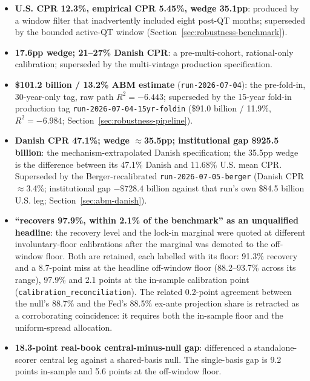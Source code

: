 \documentclass[12pt]{article}
\begin{document}
\begingroup\sloppy
\begin{itemize}
\item \textbf{U.S. CPR 12.3\%, empirical CPR 5.45\%, wedge 35.1pp}: produced by a window filter that inadvertently included eight post-QT months; superseded by the bounded active-QT window (Section~\ref{sec:robustness-benchmark}).
\item \textbf{17.6pp wedge; 21--27\% Danish CPR}: a pre-multi-cohort, rational-only calibration; superseded by the multi-vintage production specification.
\item \textbf{\$101.2 billion / 13.2\% ABM estimate} (\texttt{run-2026-07-04}): the pre-fold-in, 30-year-only tag, raw path $R^2 = -6.443$; superseded by the 15-year fold-in production tag \texttt{run-2026-07-04-15yr-foldin} (\$91.0 billion / 11.9\%, $R^2 = -6.984$; Section~\ref{sec:robustness-pipeline}).
\item \textbf{Danish CPR 47.1\%; wedge $\approx$35.5pp; institutional gap \$925.5 billion}: the mechanism-extrapolated Danish specification; the 35.5pp wedge is the difference between its 47.1\% Danish and 11.68\% U.S. mean CPR. Superseded by the Berger-recalibrated \texttt{run-2026-07-05-berger} (Danish CPR $\approx$3.4\%; institutional gap $-\$728.4$ billion against that run's own \$84.5 billion U.S. leg; Section~\ref{sec:abm-danish}).
\item \textbf{``recovers 97.9\%, within 2.1\% of the benchmark'' as an unqualified headline}: the recovery level and the lock-in marginal were quoted at different involuntary-floor calibrations after the marginal was demoted to the off-window floor. Both are retained, each labelled with its floor: 91.3\% recovery and a 8.7-point miss at the headline off-window floor (88.2--93.7\% across its range), 97.9\% and 2.1 points at the in-sample calibration point (\texttt{calibration\_reconciliation}). The related 0.2-point agreement between the null's 88.7\% and the Fed's 88.5\% ex-ante projection share is retracted as a corroborating coincidence: it requires both the in-sample floor and the uniform-spread allocation.

\item \textbf{18.3-point real-book central-minus-null gap}: differenced a standalone-scorer central leg against a shared-basis null. The single-basis gap is 9.2 points in-sample and 5.6 points at the off-window floor.


\end{itemize}
\end{document}
